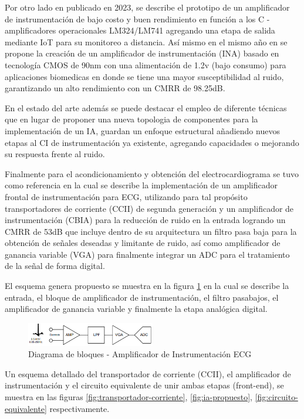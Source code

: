 \documentclass[conference]{IEEEtran}
\begin{document}
	Por otro lado en \cite{10101028} publicado en 2023, se describe el prototipo de un amplificador de instrumentación de bajo costo y buen rendimiento en función a los C -  amplificadores operacionales LM324/LM741 agregando una etapa de salida mediante IoT para su monitoreo a distancia. Así mismo en el mismo año en \cite{10373502} se propone la creación de un amplificador de instrumentación (INA) basado en tecnología CMOS de 90nm con una alimentación de 1.2v (bajo consumo) para aplicaciones biomedicas en donde se tiene una mayor susceptibilidad al ruido, garantizando un alto rendimiento con un CMRR de 98.25dB.
	
	En el estado del arte además se puede destacar el empleo de diferente técnicas que en lugar de proponer una nueva topologia de componentes para la implementación de un IA, guardan un enfoque estructural añadiendo nuevos etapas al CI de instrumentación ya existente, agregando capacidades o mejorando su respuesta frente al ruido.
	
	Finalmente para el acondicionamiento y obtención del electrocardiograma se tuvo como referencia \cite{pantuprecharat2023ecg} en la cual se describe la implementación de un amplificador frontal de instrumentación para ECG, utilizando para tal propósito transportadores de corriente (CCII) de segunda generación y un amplificador de instrumentación (CBIA) para la reducción de ruido en la entrada logrando un CMRR de 53dB que incluye dentro de su arquitectura un filtro pasa baja para la obtención de señales deseadas y limitante de ruido, así como amplificador de ganancia variable (VGA) para finalmente integrar un ADC para el tratamiento de la señal de forma digital.
	
	El esquema genera propuesto se muestra en la figura \ref{fig:ecg-amplifier} en la cual se describe la entrada, el bloque de amplificador de instrumentación, el filtro pasabajos, el amplificador de ganancia variable y finalmente la etapa analógica digital.
	
	\begin{figure}[h]
		\centering
		\includegraphics[width=0.5\textwidth]{media/ecg-amplifier}
		\caption{Diagrama de bloques - Amplificador de Instrumentación ECG}
		\label{fig:ecg-amplifier}
	\end{figure}
	
	Un esquema detallado del transportador de corriente (CCII), el amplificador de instrumentación y el circuito equivalente de unir ambas etapas (front-end), se muestra en las figuras \ref{fig:transportador-corriente}, \ref{fig:ia-propuesto}, \ref{fig:circuito-equivalente} respectivamente.
		
\end{document}
